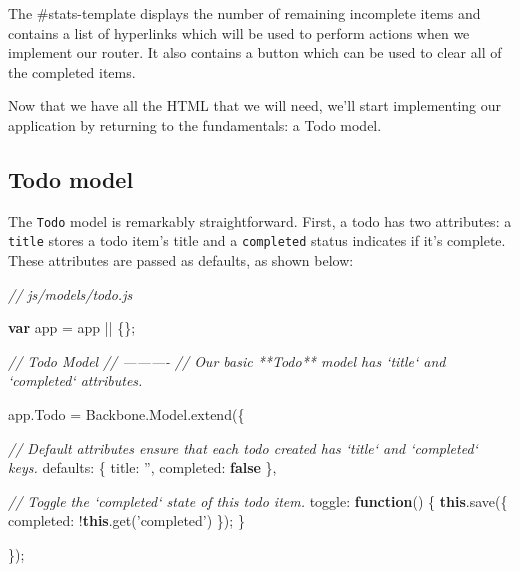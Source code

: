 \documentclass[9pt]{book}
\newenvironment{Shaded}{}{}
\newcommand{\KeywordTok}[1]{\textcolor[rgb]{0.00,0.44,0.13}{\textbf{{#1}}}}
\newcommand{\DataTypeTok}[1]{\textcolor[rgb]{0.56,0.13,0.00}{{#1}}}
\newcommand{\StringTok}[1]{\textcolor[rgb]{0.25,0.44,0.63}{{#1}}}
\newcommand{\CommentTok}[1]{\textcolor[rgb]{0.38,0.63,0.69}{\textit{{#1}}}}
\newcommand{\OtherTok}[1]{\textcolor[rgb]{0.00,0.44,0.13}{{#1}}}
\newcommand{\FunctionTok}[1]{\textcolor[rgb]{0.02,0.16,0.49}{{#1}}}
\newcommand{\NormalTok}[1]{{#1}}
\begin{document}
The \#stats-template displays the number of remaining incomplete items
and contains a list of hyperlinks which will be used to perform actions
when we implement our router. It also contains a button which can be
used to clear all of the completed items.

Now that we have all the HTML that we will need, we'll start
implementing our application by returning to the fundamentals: a Todo
model.

\subsection{Todo model}\label{todo-model}

The \texttt{Todo} model is remarkably straightforward. First, a todo has
two attributes: a \texttt{title} stores a todo item's title and a
\texttt{completed} status indicates if it's complete. These attributes
are passed as defaults, as shown below:

\begin{Shaded}
\begin{Highlighting}[]

  \CommentTok{// js/models/todo.js}

  \KeywordTok{var} \NormalTok{app = app || \{\};}

  \CommentTok{// Todo Model}
  \CommentTok{// ----------}
  \CommentTok{// Our basic **Todo** model has `title` and `completed` attributes.}

  \OtherTok{app}\NormalTok{.}\FunctionTok{Todo} \NormalTok{= }\OtherTok{Backbone}\NormalTok{.}\OtherTok{Model}\NormalTok{.}\FunctionTok{extend}\NormalTok{(\{}

    \CommentTok{// Default attributes ensure that each todo created has `title` and `completed` keys.}
    \DataTypeTok{defaults}\NormalTok{: \{}
      \DataTypeTok{title}\NormalTok{: }\StringTok{''}\NormalTok{,}
      \DataTypeTok{completed}\NormalTok{: }\KeywordTok{false}
    \NormalTok{\},}

    \CommentTok{// Toggle the `completed` state of this todo item.}
    \DataTypeTok{toggle}\NormalTok{: }\KeywordTok{function}\NormalTok{() \{}
      \KeywordTok{this}\NormalTok{.}\FunctionTok{save}\NormalTok{(\{}
        \DataTypeTok{completed}\NormalTok{: !}\KeywordTok{this}\NormalTok{.}\FunctionTok{get}\NormalTok{(}\StringTok{'completed'}\NormalTok{)}
      \NormalTok{\});}
    \NormalTok{\}}

  \NormalTok{\});}
\end{Highlighting}
\end{Shaded}
\end{document}
